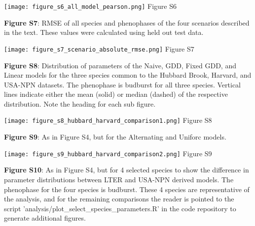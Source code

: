\documentclass[a4paper,12pt]{article}
\begin{document}
\newpage

\begin{center}
	\centering
		\texttt{[image: figure\_s6\_all\_model\_pearson.png]}
	Figure S6
\end{center}


\newpage

\textbf{Figure S7}: RMSE of all species and phenophases of the four scenarios described in the text. These values were calculated using held out test data.

\newpage

\begin{center}
	\centering
		\texttt{[image: figure\_s7\_scenario\_absolute\_rmse.png]}
	Figure S7
\end{center}

\newpage

\textbf{Figure S8}: Distribution of parameters of the Naive, GDD, Fixed GDD, and Linear models for the three species common to the Hubbard Brook, Harvard, and USA-NPN datasets. The phenophase is budburst for all three species. Vertical lines indicate either the mean (solid) or median (dashed) of the respective distribution. Note the heading for each sub figure. 

\newpage

\begin{center}
	\centering
		\texttt{[image: figure\_s8\_hubbard\_harvard\_comparison1.png]}
	Figure S8
\end{center}

\newpage

\textbf{Figure S9}: As in Figure S4, but for the Alternating and Uniforc models. 

\newpage

\begin{center}
	\centering
		\texttt{[image: figure\_s9\_hubbard\_harvard\_comparison2.png]}
	Figure S9
\end{center}

\newpage

\textbf{Figure S10}: As in Figure S4, but for 4 selected species to show the difference in parameter distributions between LTER and USA-NPN derived models. The phenophase for the four species is budburst. These 4 species are representative of the analysis, and for the remaining comparisons the reader is pointed to the script 'analysis/plot\_select\_species\_parameters.R' in the code repository to generate additional figures.
\end{document}
